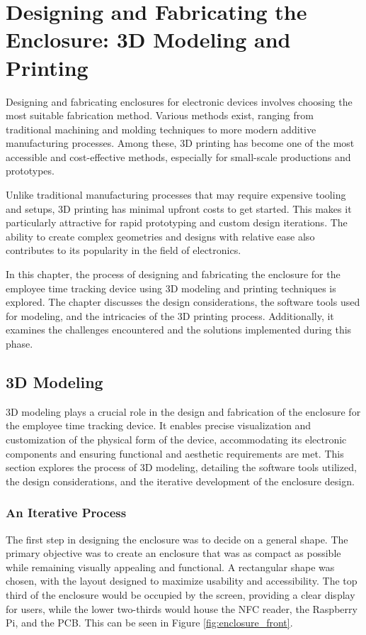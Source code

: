 \chapter{Designing and Fabricating the Enclosure: 3D Modeling and Printing}
\label{cap:3dModelingAndPrinting}

Designing and fabricating enclosures for electronic devices involves choosing the most suitable 
fabrication method. Various methods exist, ranging from traditional machining and molding 
techniques to more modern additive manufacturing processes. Among these, 3D printing has become 
one of the most accessible and cost-effective methods, especially for small-scale productions and 
prototypes.

Unlike traditional manufacturing processes that may require expensive tooling and setups, 3D 
printing has minimal upfront costs to get started. This makes it particularly attractive for rapid 
prototyping and custom design iterations. The ability to create complex geometries and designs 
with relative ease also contributes to its popularity in the field of electronics.

In this chapter, the process of designing and fabricating the enclosure for the employee time 
tracking device using 3D modeling and printing techniques is explored. The chapter discusses the 
design considerations, the software tools used for modeling, and the intricacies of the 3D 
printing process. Additionally, it examines the challenges encountered and the solutions 
implemented during this phase.


\section{3D Modeling}

3D modeling plays a crucial role in the design and fabrication of the enclosure for the employee 
time tracking device. It enables precise visualization and customization of the physical form of 
the device, accommodating its electronic components and ensuring functional and aesthetic 
requirements are met. This section explores the process of 3D modeling, detailing the software 
tools utilized, the design considerations, and the iterative development of the enclosure design. 

\subsection{An Iterative Process}

The first step in designing the enclosure was to decide on a general shape. The primary objective 
was to create an enclosure that was as compact as possible while remaining visually appealing and 
functional. A rectangular shape was chosen, with the layout designed to maximize usability and 
accessibility. The top third of the enclosure would be occupied by the screen, providing a clear 
display for users, while the lower two-thirds would house the NFC reader, the Raspberry Pi, and 
the PCB. This can be seen in Figure \ref{fig:enclosure_front}.

